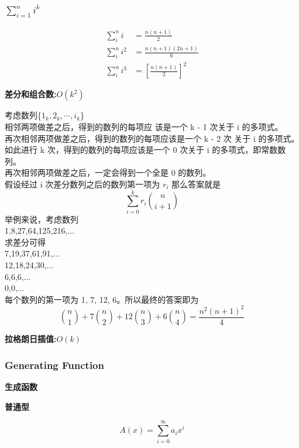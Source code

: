 \documentclass[10pt]{ctexart}
\begin{document}
{{\subsubsection{$\sum_{i=1}^n i^k$}
\begin{equation*}
\begin{aligned}
\sum_i^n i &= \frac{n(n + 1)}{2}\\
\sum_i^n i^2 &= \frac{n(n + 1)(2n + 1)}{6}\\
\sum_i^n i^3 &= [\frac{n(n + 1)}{2}] ^ 2
\end{aligned}
\end{equation*}
{\large\bfseries 差分和组合数:$O(k^2)$\par}
考虑数列\{$1_k,2_k,\cdots,i_k$\}\\
相邻两项做差之后，得到的数列的每项应 该是一个 k - 1 次关于 i 的多项式。\\
再次相邻两项做差之后，得到的数列的每项应该是一个 k - 2 次 关于 i 的多项式。\\
如此进行 k 次，得到的数列的每项应该是一个 0 次关于 i 的多项式，即常数数列。\\
再次相邻两项做差之后，一定会得到一个全是 0 的数列。 \\
假设经过 i 次差分数列之后的数列第一项为 $r_i$ 那么答案就是\\
$$
\sum_{i=0}^k r_i \binom{n}{i+1}
$$
举例来说，考虑数列\\
1,8,27,64,125,216,... \\
求差分可得\\
7,19,37,61,91,... \\
12,18,24,30,... \\
6,6,6,...\\
0,0,...\\
每个数列的第一项为 1, 7, 12, 6。所以最终的答案即为\\
$$
\binom{n}{1} + 7\binom{n}{2}+12\binom{n}{3}+6\binom{n}{4} =\frac{n^2(n+1)^2}{4}
$$
{\large\bfseries 拉格朗日插值:$O(k)$\par}
\subsubsection{Generating Function}
{\Large\bfseries 生成函数\par}
{\large\bfseries 普通型\par}
$$
A(x) = \sum_{i=0}^{\infty}a_ix^i
$$

}}
\end{document}
